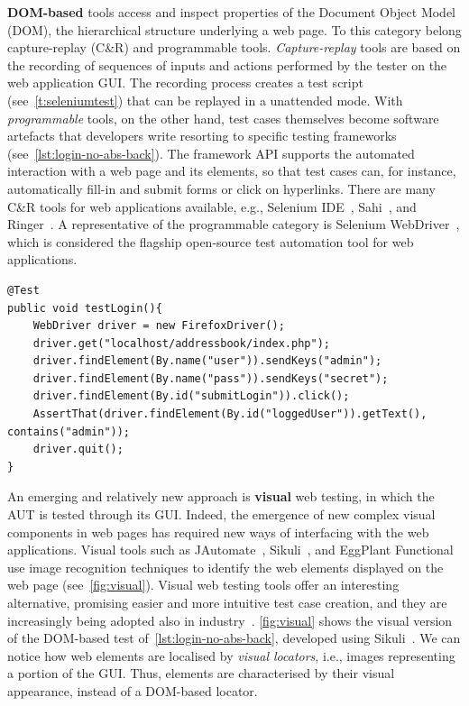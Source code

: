 \textbf{DOM-based} tools access and inspect properties of the Document Object Model (DOM), the hierarchical structure underlying a web page. To this category belong capture-replay (C\&R) and programmable tools. \textit{Capture-replay} tools are based on the recording of sequences of inputs and actions performed by the tester on the web application GUI. The recording process creates a test script (see~\autoref{t:seleniumtest}) that can be replayed in a unattended mode. 
With \textit{programmable} tools, on the other hand, test cases themselves become software artefacts that developers write 
resorting to specific testing frameworks (see~\autoref{lst:login-no-abs-back}). The framework API supports the automated interaction with a web page and its elements, so that test cases can, for instance, automatically fill-in and submit forms or click on hyperlinks. There are many C\&R tools for web applications available, e.g., Selenium IDE~\cite{selenium}, Sahi~\cite{sahi}, and Ringer~\cite{ringer}. A representative of the programmable category is Selenium WebDriver~\cite{selenium}, which is considered the flagship open-source test automation tool for web applications.

\begin{lstlisting}[firstnumber=1, xrightmargin=6ex, float=t,numbers=right,caption={An example of programmable automated test (Selenium WebDriver)},label=lst:login-no-abs-back]
@Test
public void testLogin(){
	WebDriver driver = new FirefoxDriver();
	driver.get("localhost/addressbook/index.php");
	driver.findElement(By.name("user")).sendKeys("admin");
	driver.findElement(By.name("pass")).sendKeys("secret");
	driver.findElement(By.id("submitLogin")).click();
	AssertThat(driver.findElement(By.id("loggedUser")).getText(), contains("admin"));
	driver.quit();
}
\end{lstlisting}

An emerging and relatively new approach is \textbf{visual} web testing, in which the AUT is tested through its GUI. Indeed, the emergence of new complex visual components in web pages has required new ways of interfacing with the web applications. Visual tools such as JAutomate~\cite{Alegroth2013jat}, Sikuli~\cite{Sikuli}, and EggPlant Functional~\cite{eggplant} use image recognition techniques to identify the web elements displayed on the web page (see~\autoref{fig:visual}). Visual web testing tools offer an interesting alternative, promising easier and more intuitive test case creation, and they are increasingly being adopted also in industry~\cite{Alegroth2013jat}. 
\autoref{fig:visual} shows the visual version of the DOM-based test of~\autoref{lst:login-no-abs-back}, developed using Sikuli~\cite{Sikuli}. We can notice how web elements are localised by \textit{visual locators}, i.e., images representing a portion of the GUI. Thus, elements are characterised by their visual appearance, instead of a DOM-based locator.

